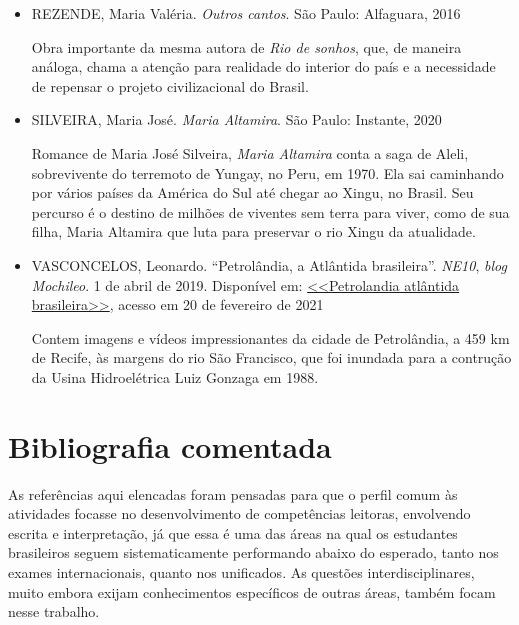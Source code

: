 \documentclass[12pt]{extarticle}
\begin{document}
\begin{itemize}
\item    REZENDE, Maria Valéria. \emph{Outros cantos}. São Paulo: Alfaguara,
    2016

    Obra importante da mesma autora de \emph{Rio de sonhos}, que, de
    maneira análoga, chama a atenção para realidade do interior do país
    e a necessidade de repensar o projeto civilizacional do Brasil.

\item    SILVEIRA, Maria José. \emph{Maria Altamira}. São Paulo: Instante,
    2020

    Romance de Maria José Silveira, \emph{Maria Altamira} conta a saga
    de Aleli, sobrevivente do terremoto de Yungay, no Peru, em 1970. Ela
    sai caminhando por vários países da América do Sul até chegar ao
    Xingu, no Brasil. Seu percurso é o destino de milhões de viventes
    sem terra para viver, como de sua filha, Maria Altamira que luta
    para preservar o rio Xingu da atualidade.

\item    VASCONCELOS, Leonardo. ``Petrolândia, a Atlântida brasileira''.
    \emph{NE10}, \emph{blog Mochileo}. 1 de abril de 2019. Disponível
    em:
    \href{https://m.blogs.ne10.uol.com.br/mochileo/2019/04/01/petrolandia-atlantida-brasileira/}{<<Petrolandia atlântida brasileira>>},
    acesso em 20 de fevereiro de 2021

    Contem imagens e vídeos impressionantes da cidade de Petrolândia, a
    459 km de Recife, às margens do rio São Francisco, que foi inundada
    para a contrução da Usina Hidroelétrica Luiz Gonzaga em 1988.
\end{itemize}

\section{Bibliografia comentada}

    As referências aqui elencadas foram pensadas para que o perfil comum
    às atividades focasse no desenvolvimento de competências leitoras,
    envolvendo escrita e interpretação, já que essa é uma das áreas na
    qual os estudantes brasileiros seguem sistematicamente performando
    abaixo do esperado, tanto nos exames internacionais, quanto nos
    unificados. As questões interdisciplinares, muito embora exijam
    conhecimentos específicos de outras áreas, também focam nesse
    trabalho.
\end{document}
